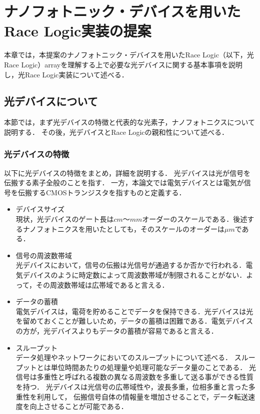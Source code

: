 \chapter{ナノフォトニック・デバイスを用いたRace Logic実装の提案}
本章では，本提案のナノフォトニック・デバイスを用いたRace Logic（以下，光Race Logic）arrayを理解する上で必要な光デバイスに関する基本事項を説明し，光Race Logic実装について述べる．

\section{光デバイスについて}
本節では，まず光デバイスの特徴と代表的な光素子，ナノフォトニクスについて説明する．
その後，光デバイスとRace Logicの親和性について述べる．

\subsection{光デバイスの特徴}
以下に光デバイスの特徴をまとめ，詳細を説明する．
光デバイスは光が信号を伝搬する素子全般のことを指す．
一方，本論文では電気デバイスとは電気が信号を伝搬するCMOSトランジスタを指すものと定義する．
\begin{itemize}
\item デバイスサイズ\\
現状，光デバイスのゲート長は$cm$〜$mm$オーダーのスケールである．後述するナノフォトニクスを用いたとしても，そのスケールのオーダーは$\mu m$である．
\item 信号の周波数帯域\\
光デバイスにおいて，信号の伝搬は光信号が通過するか否かで行われる．電気デバイスのように時定数によって周波数帯域が制限されることがない．よって，その周波数帯域は広帯域であると言える．
\item データの蓄積\\
電気デバイスは，電荷を貯めることでデータを保持できる．光デバイスは光を留めておくことが難しいため，データの蓄積は困難である．電気デバイスの方が，光デバイスよりもデータの蓄積が容易であると言える．
\item スループット\\
データ処理やネットワークにおいてのスループットについて述べる．
スループットとは単位時間あたりの処理量や処理可能なデータ量のことである．
光信号は多重性と呼ばれる複数の異なる周波数を多重して送る事ができる性質を持つ．
光デバイスは光信号の広帯域性や，波長多重，位相多重と言った多重性を利用して，
伝搬信号自体の情報量を増加させることで，データ転送速度を向上させることが可能である．
\end{itemize}

